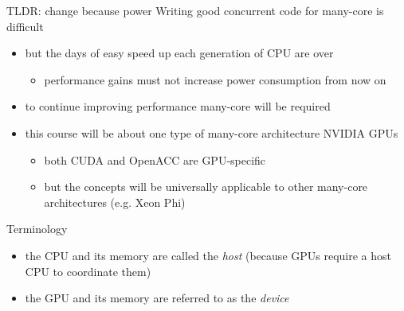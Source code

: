 \documentclass[aspectratio=43]{beamer}
\begin{document}
\begin{frame}[fragile]{}
    \begin{info}{TLDR: change because power}
        Writing good concurrent code for many-core is difficult
        \begin{itemize}
            \item but the days of easy speed up each generation of CPU are over
            \begin{itemize}
                \item performance gains must not increase power consumption from now on
            \end{itemize}
            \item to continue improving performance many-core will be required
            \item this course will be about one type of many-core architecture NVIDIA GPUs
            \begin{itemize}
                \item both CUDA and OpenACC are GPU-specific
                \item but the concepts will be universally applicable to other many-core architectures (e.g. Xeon Phi)
            \end{itemize}
        \end{itemize}
    \end{info}
\end{frame}

\begin{frame}[fragile]{}
    \begin{info}{Terminology}
        \begin{itemize}
            \item the CPU and its memory are called the \emph{host} (because GPUs require a host CPU to coordinate them)
            \item the GPU and its memory are referred to as the \emph{device}
        \end{itemize}
    \end{info}
\end{frame}
\end{document}
